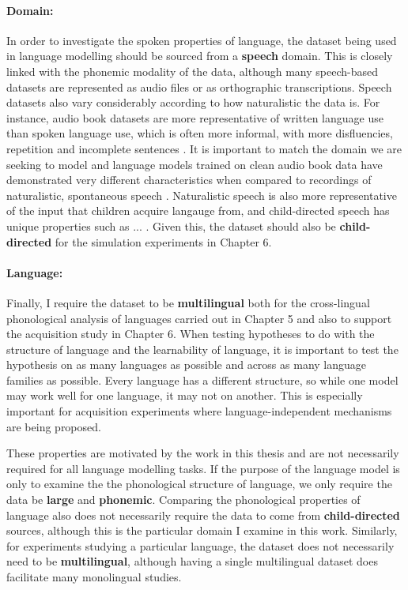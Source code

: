 \paragraph{Domain:} In order to investigate the spoken properties of language, the dataset being used in language modelling should be sourced from a \textbf{speech} domain. This is closely linked with the phonemic modality of the data, although many speech-based datasets are represented as audio files or as orthographic transcriptions. Speech datasets also vary considerably according to how naturalistic the data is. For instance, audio book datasets are more representative of written language use than spoken language use, which is often more informal, with more disfluencies, repetition and incomplete sentences \rough{[citation]}. It is important to match the domain we are seeking to model and language models trained on clean audio book data have demonstrated very different characteristics when compared to recordings of naturalistic, spontaneous speech \citep{lavechin}. Naturalistic speech is also more representative of the input that children acquire langauge from, and child-directed speech has unique properties such as ... . Given this, the dataset should also be \textbf{child-directed} for the simulation experiments in Chapter 6. 

\paragraph{Language:} Finally, I require the dataset to be \textbf{multilingual} both for the cross-lingual phonological analysis of languages carried out in Chapter 5 and also to support the acquisition study in Chapter 6. When testing hypotheses to do with the structure of language and the learnability of language, it is important to test the hypothesis on as many languages as possible and across as many language families as possible. Every language has a different structure, so while one model may work well for one language, it may not on another. This is especially important for acquisition experiments where language-independent mechanisms are being proposed. 

These properties are motivated by the work in this thesis and are not necessarily required for all language modelling tasks. If the purpose of the language model is only to examine the the phonological structure of language, we only require the data be \textbf{large} and \textbf{phonemic}. Comparing the phonological properties of language also does not necessarily require the data to come from \textbf{child-directed} sources, although this is the particular domain I examine in this work. Similarly, for experiments studying a particular language, the dataset does not necessarily need to be \textbf{multilingual}, although having a single multilingual dataset does facilitate many monolingual studies.

